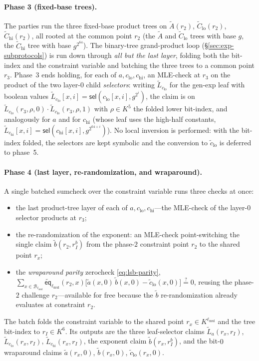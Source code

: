 \documentclass{article}
\theoremstyle{definition}
\newcommand*{\mle}{\widetilde}
\newcommand{\eq}{\mathsf{eq}}
\newcommand{\BB}{\mathcal{B}}
\newcommand{\sel}{\textsf{sel}}
\begin{document}
\paragraph{Phase 3 (fixed-base trees).}
The parties run the three fixed-base product trees on $\mle{A}(r_2)$, $\mle{C}_\text{lo}(r_2)$, $\mle{C}_\text{hi}(r_2)$, all rooted at the common point $r_2$ (the $\mle{A}$ and $\mle{C}_\text{lo}$ trees with base $g$, the $\mle{C}_\text{hi}$ tree with base $g^{2^{64}}$). The binary-tree grand-product loop (\S\ref{sec:exp-subprotocols}) is run down through \emph{all but the last layer}, folding both the bit-index and the constraint variable and batching the three trees to a common point $r_3$. Phase~3 ends holding, for each of $a, c_\text{lo}, c_\text{hi}$, an MLE-check at $r_3$ on the product of the two layer-$0$ child \emph{selectors}: writing $\mle{L}_{c_\text{lo}}$ for the gen-exp leaf with boolean values $\mle{L}_{c_\text{lo}}[x, i] = \sel(c_\text{lo}[x, i], g^{2^i})$, the claim is on $\mle{L}_{c_\text{lo}}(r_3, \rho, 0) \cdot \mle{L}_{c_\text{lo}}(r_3, \rho, 1)$ with $\rho \in K^5$ the folded lower bit-index, and analogously for $a$ and for $c_\text{hi}$ (whose leaf uses the high-half constants, $\mle{L}_{c_\text{hi}}[x, i] = \sel(c_\text{hi}[x, i], g^{2^{64 + i}})$). No local inversion is performed: with the bit-index folded, the selectors are kept symbolic and the conversion to $\mle{c}_\text{lo}$ is deferred to phase~5.

\paragraph{Phase 4 (last layer, re-randomization, and wraparound).}
A single batched sumcheck over the constraint variable runs three checks at once:
\begin{itemize}
\item the last product-tree layer of each of $a, c_\text{lo}, c_\text{hi}$---the MLE-check of the layer-$0$ selector products at $r_3$;
\item the re-randomization of the exponent: an MLE-check point-switching the single claim $\mle{b}(r_2, r_I^b)$ from the phase-$2$ constraint point $r_2$ to the shared point $r_x$;
\item the \emph{wraparound parity} zerocheck \eqref{eq:lsb-parity}, $\sum_{x \in \BB_{\ell_\text{mul}}} \mle{\eq}_{\ell_\text{mul}}(r_2, x) \bigl[ \mle{a}(x, 0) \, \mle{b}(x, 0) - \mle{c}_\text{lo}(x, 0) \bigr] \stackrel{?}{=} 0$, reusing the phase-$2$ challenge $r_2$---available for free because the $\mle{b}$ re-randomization already evaluates at constraint $r_2$.
\end{itemize}
The batch folds the constraint variable to the shared point $r_x \in K^{\ell_\text{mul}}$ and the tree bit-index to $r_I \in K^6$. Its outputs are the three leaf-selector claims $\mle{L}_a(r_x, r_I)$, $\mle{L}_{c_\text{lo}}(r_x, r_I)$, $\mle{L}_{c_\text{hi}}(r_x, r_I)$, the exponent claim $\mle{b}(r_x, r_I^b)$, and the bit-$0$ wraparound claims $\mle{a}(r_x, 0)$, $\mle{b}(r_x, 0)$, $\mle{c}_\text{lo}(r_x, 0)$.
\end{document}
